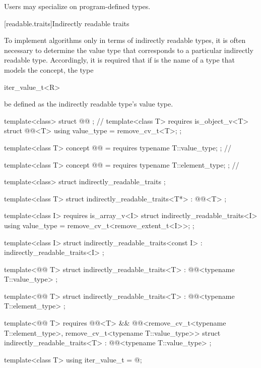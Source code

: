\pnum
Users may specialize  on program-defined types.

[readable.traits]{Indirectly readable traits}

\pnum
To implement algorithms only in terms of indirectly readable types,
it is often necessary
to determine the value type that corresponds to
a particular indirectly readable type.
Accordingly, it is required that if  is the name of a type that
models the  concept,
the type
\begin{codeblock}
iter_value_t<R>
\end{codeblock}
be defined as the indirectly readable type's value type.

%
\begin{codeblock}
template<class> struct @@ { };     // \expos
template<class T>
  requires is_object_v<T>
struct @@<T> {
  using value_type = remove_cv_t<T>;
};

template<class T>
  concept @@ = requires { typename T::value_type; };         // \expos

template<class T>
  concept @@ = requires { typename T::element_type; };     // \expos

template<class> struct indirectly_readable_traits { };

template<class T>
struct indirectly_readable_traits<T*>
  : @@<T> { };

template<class I>
  requires is_array_v<I>
struct indirectly_readable_traits<I> {
  using value_type = remove_cv_t<remove_extent_t<I>>;
};

template<class I>
struct indirectly_readable_traits<const I>
  : indirectly_readable_traits<I> { };

template<@@ T>
struct indirectly_readable_traits<T>
  : @@<typename T::value_type> { };

template<@@ T>
struct indirectly_readable_traits<T>
  : @@<typename T::element_type> { };

template<@@ T>
  requires @@<T> &&
           @@<remove_cv_t<typename T::element_type>, remove_cv_t<typename T::value_type>>
struct indirectly_readable_traits<T>
  : @@<typename T::value_type> { };

template<class T> using iter_value_t = @\seebelow@;
\end{codeblock}

